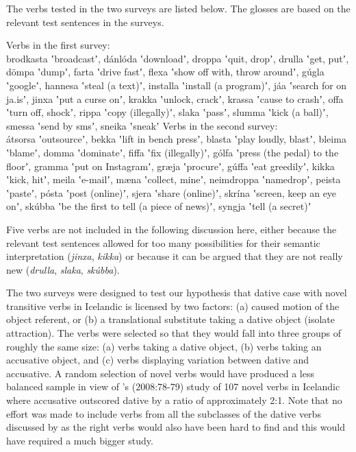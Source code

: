 \documentclass[output=paper,modfonts,nonflat,colorlinks,citecolor=brown]{langsci/langscibook}
\begin{document}
{The verbs tested in the two surveys are listed below. The glosses are based on the relevant test sentences in the surveys. 


\ea
\ea Verbs in the first survey: \\
brodkasta ʽbroadcastʼ, dánlóda ʽdownloadʼ, droppa ʽquit, dropʼ, drulla ʽget, putʼ, dömpa ʽdumpʼ, farta ʽdrive fastʼ, flexa ʽshow off with, throw aroundʼ, gúgla ʽgoogleʼ, hannesa ʽsteal (a text)ʼ, installa ʽinstall (a program)ʼ, jáa ʽsearch for on ja.isʼ, jinxa ʽput a curse onʼ, krakka ʽunlock, crackʼ, krassa ʽcause to crashʼ, offa ʽturn off, shockʼ, rippa ʽcopy (illegally)ʼ, slaka ʽpassʼ, slumma ʽkick (a ball)ʼ, smessa ʽsend by smsʼ, sneika ʽsneakʼ
\ex Verbs in the second survey: \\
átsorsa ʽoutsourceʼ, bekka ʽlift in bench pressʼ, blasta ʽplay loudly, blastʼ, bleima ʽblameʼ, domma ʽdominateʼ, fiffa ʽfix (illegally)ʼ, gólfa ʽpress (the pedal) to the floorʼ, gramma ʽput on Instagramʼ, græja ʽprocureʼ, gúffa ʽeat greedilyʼ, kikka ʽkick, hitʼ, meila ʽe-mailʼ, mæna ʽcollect, mineʼ, neimdroppa ʽnamedropʼ, peista ʽpasteʼ, pósta ʽpost (online)ʼ, sjera ʽshare (online)ʼ, skrína ʽscreen, keep an eye onʼ, skúbba ʽbe the first to tell (a piece of news)ʼ, syngja ʽtell (a secret)ʼ\\
\z
\z

Five verbs are not included in the following discussion here, either because the relevant test sentences allowed for too many possibilities for their semantic interpretation (\textit{jinxa}, \textit{kikka}) or because it can be argued that they are not really new  (\textit{drulla}, \textit{slaka}, \textit{skúbba}). 


The two surveys were designed to test our hypothesis that dative case with novel transitive verbs in Icelandic is licensed by two factors: (a) caused motion of the object referent, or (b) a translational substitute taking a dative object (isolate attraction). The verbs were selected so that they would fall into three groups of roughly the same size: (a) verbs taking a dative object, (b) verbs taking an accusative object, and (c) verbs displaying variation between dative and accusative. A random selection of novel verbs would have produced a less balanced sample in view of \citeauthor{Barðdal2008}’s (2008:78-79) study of 107 novel verbs in Icelandic where accusative outscored dative by a ratio of approximately 2:1. Note that no effort was made to include verbs from all the subclasses of the dative verbs discussed by \citet{Maling2002} as the right verbs would also have been hard to find and this would have required a much bigger study.


}
\end{document}
